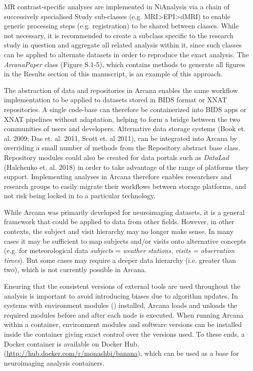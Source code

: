 MR contrast-specific analyses are implemented in NiAnalysis via a chain
of successively specialised Study sub-classes (e.g.
MRI\textgreater{}EPI\textgreater{}dMRI) to enable generic processing
steps (e.g. registration) to be shared between classes. While not
necessary, it is recommended to create a subclass specific to the
research study in question and aggregate all related analysis within it,
since such classes can be applied to alternate datasets in order to
reproduce the exact analysis. The \emph{ArcanaPaper} class (Figure
S.1-5), which contains methods to generate all figures in the Results
section of this manuscript, is an example of this approach.

The abstraction of data and repositories in Arcana enables the same
workflow implementation to be applied to datasets stored in BIDS format
or XNAT repositories. A single code-base can therefore be containerized
into BIDS apps or XNAT pipelines without adaptation, helping to form a
bridge between the two communities of users and developers. Alternative
data storage systems (Book et. al. 2009; Das et. al. 2011, Scott et. al 2011), can be integrated into Arcana by overriding a small number of
methods from the Repository abstract base class. Repository modules
could also be created for data portals such as \emph{DataLad} (Halchenko et. al. 2018) in order to take advantage of the range of platforms they support.
Implementing analyses in Arcana therefore enables researchers and
research groups to easily migrate their workflows between storage
platforms, and not risk being locked in to a particular technology.

While Arcana was primarily developed for neuroimaging datasets, it is a
general framework that could be applied to data from other fields.
However, in other contexts, the subject and visit hierarchy may no
longer make sense. In many cases it may be sufficient to map subjects
and/or visits onto alternative concepts (e.g. for meteorological data
\emph{subjects} = \emph{weather stations}, \emph{visits = observation
times}). But some cases may require a deeper data hierarchy (i.e.
greater than two), which is not currently possible in Arcana.

Ensuring that the consistent versions of external tools are used
throughout the analysis is important to avoid introducing biases due to
algorithm updates. In systems with environment modules (\cite{furlani_modules:_1991})
installed, Arcana loads and unloads the required modules before and
after each node is executed. When running Arcana within a container,
environment modules and software versions can be installed inside the
container giving exact control over the versions used. To these ends, a
Docker container is available on Docker Hub,
(\href{http://hub.docker.com/r/monashbi/banana}{{http://hub.docker.com/r/monashbi/banana}}),
which can be used as a base for neuroimaging analysis containers.

